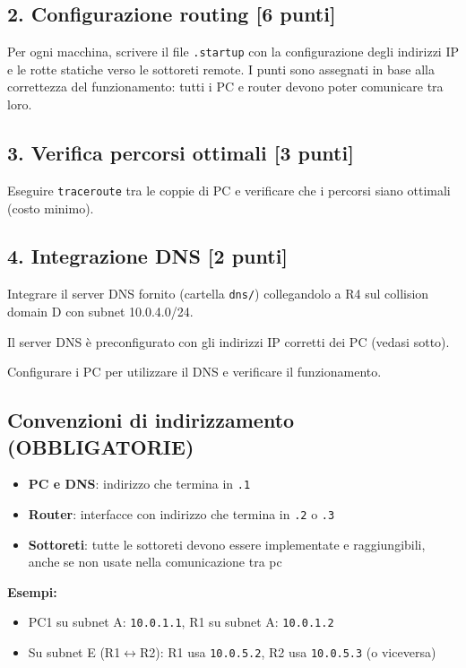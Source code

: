\documentclass[a4paper,11pt]{article}
\begin{document}
\subsection*{2. Configurazione routing [6 punti]}

Per ogni macchina, scrivere il file \texttt{.startup} con la configurazione degli indirizzi IP e le rotte statiche verso le sottoreti remote. I punti sono assegnati in base alla correttezza del funzionamento: tutti i PC e router devono poter comunicare tra loro.

\subsection*{3. Verifica percorsi ottimali [3 punti]}

Eseguire \texttt{traceroute} tra le coppie di PC e verificare che i percorsi siano ottimali (costo minimo).

\subsection*{4. Integrazione DNS [2 punti]}

Integrare il server DNS fornito (cartella \texttt{dns/}) collegandolo a R4 sul collision domain D con subnet 10.0.4.0/24.

Il server DNS è preconfigurato con gli indirizzi IP corretti dei PC (vedasi sotto).

Configurare i PC per utilizzare il DNS e verificare il funzionamento.

\subsection*{Convenzioni di indirizzamento (OBBLIGATORIE)}


\begin{itemize}
    \item \textbf{PC e DNS}: indirizzo che termina in \texttt{.1}
    \item \textbf{Router}: interfacce con indirizzo che termina in \texttt{.2} o \texttt{.3}
    \item \textbf{Sottoreti}: tutte le sottoreti devono essere implementate e raggiungibili, anche se non usate nella comunicazione tra pc
\end{itemize}

\textbf{Esempi:}
\begin{itemize}
    \item PC1 su subnet A: \texttt{10.0.1.1}, R1 su subnet A: \texttt{10.0.1.2}
    \item Su subnet E (R1$\leftrightarrow$R2): R1 usa \texttt{10.0.5.2}, R2 usa \texttt{10.0.5.3} (o viceversa)
\end{itemize}
\end{document}
